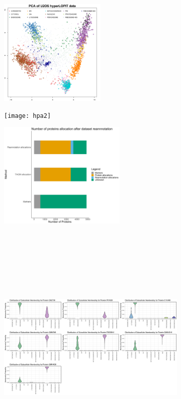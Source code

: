 \documentclass[12pt,english]{article}
\begin{document}
\begin{figure}[h]
	\begin{subfigure}[t]{0.3\textwidth}
		\centering
		\includegraphics[height=2in]{u2ospcaF}
		\caption{}
	\end{subfigure}
	\begin{subfigure}[t]{0.3\textwidth}
	\centering
	\texttt{[image: hpa2]}
	\caption{}
	\end{subfigure}
	\begin{subfigure}[t]{0.3\textwidth}
	\centering
	\includegraphics[height=2in]{summaryu2os}
	\caption{}
	\end{subfigure}
	~
	\begin{subfigure}[t]{1\textwidth}
		\centering
		\includegraphics[height=4in]{endoViolin}

\end{subfigure}
\end{figure}
\end{document}
